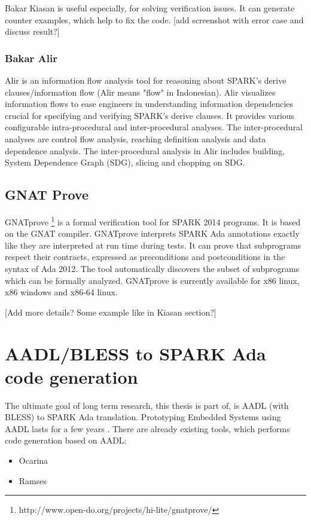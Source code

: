 Bakar Kiasan is useful especially, for solving verification issues. It can generate counter examples, which help to fix the code.
[add screenshot with error case and discuss result?]


\subsubsection{Bakar Alir}
Alir is an information flow analysis tool for reasoning about SPARK's derive clauses/information flow (Alir means "flow" in Indonesian). Alir visualizes information flows to ease engineers in understanding information dependencies crucial for specifying and verifying SPARK's derive clauses. It provides various configurable intra-procedural and inter-procedural analyses. The inter-procedural analyses are control flow analysis, reaching definition analysis and data dependence analysis. The inter-procedural analysis in Alir includes building, System Dependence Graph (SDG), slicing and chopping on SDG. \cite{Hari:Thesis}


\subsection{GNAT Prove}
\label{background:spark:gnatprove}

GNATprove \footnote{http://www.open-do.org/projects/hi-lite/gnatprove/} is a formal verification tool for SPARK 2014 programs. It is based on the GNAT compiler. GNATprove interprets SPARK Ada annotations exactly like they are interpreted at run time during tests. It can prove that subprograms respect their contracts, expressed as preconditions and postconditions in the syntax of Ada 2012. The tool automatically discovers the subset of subprograms which can be formally analyzed. GNATprove is currently available for x86 linux, x86 windows and x86-64 linux.

[Add more details? Some example like in Kiasan section?]



\section{AADL/BLESS to SPARK Ada code generation}
\label{background:codegen}

The ultimate goal of long term research, this thesis is part of, is AADL (with BLESS) to SPARK Ada translation. Prototyping Embedded Systems using AADL lasts for a few years \cite{PrototypyingAadl:Paper}. There are already existing tools, which performs code generation based on AADL:
\begin{itemize}
	\item Ocarina
	\item Ramses
\end{itemize}



